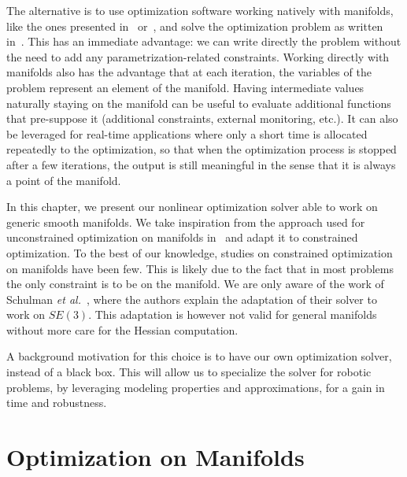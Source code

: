The alternative is to use optimization software working natively with manifolds, like the ones presented in~\cite{brossette:Humanoids:2015} or~\cite{absil:book:2008}, and solve the optimization problem as written in~.
This has an immediate advantage: we can write directly the problem without the need to add any parametrization-related constraints.
Working directly with manifolds also has the advantage that at each iteration, the variables of the problem represent an element of the manifold.
Having intermediate values naturally staying on the manifold can be useful to evaluate additional functions that pre-suppose it (additional constraints, external monitoring, etc.).
It can also be leveraged for real-time applications where only a short time is allocated repeatedly to the optimization, so that when the optimization process is stopped after a few iterations, the output is still meaningful in the sense that it is always a point of the manifold.

In this chapter, we present our nonlinear optimization solver able to work on generic smooth manifolds.
We take inspiration from the approach used for unconstrained optimization on manifolds in~\cite{absil:book:2008} and adapt it to constrained optimization.
To the best of our knowledge, studies on constrained optimization on manifolds have been few.
This is likely due to the fact that in most problems the only constraint is to be on the manifold.%
We are only aware of the work of Schulman \emph{et al.}~\cite{Schulman2014}, where the authors explain the adaptation of their solver to work on $SE(3)$.
This adaptation is however not valid for general manifolds without more care for the Hessian computation.

A background motivation for this choice is to have our own optimization solver, instead of a black box.
This will allow us to specialize the solver for robotic problems, by leveraging modeling properties and approximations, for a gain in time and robustness.

\section{Optimization on Manifolds}
\label{sec:optimization_on_manifolds}

